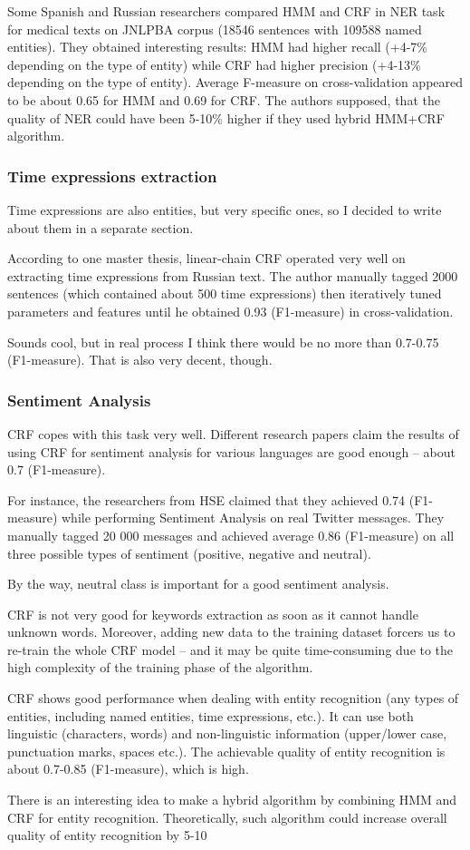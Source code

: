 Some Spanish and Russian researchers compared HMM and CRF in NER task for medical texts on JNLPBA corpus (18546 sentences with 109588 named entities). They obtained interesting results: HMM had higher recall (+4-7\% depending on the type of entity) while CRF had higher precision (+4-13\% depending on the type of entity). Average F-measure on cross-validation appeared to be about 0.65 for HMM and 0.69 for CRF. The authors supposed, that the quality of NER could have been 5-10\% higher if they used hybrid HMM+CRF algorithm.


\subsubsection{Time expressions extraction}

Time expressions are also entities, but very specific ones, so I decided to write about them in a separate section.

According to one master thesis, linear-chain CRF operated very well on extracting time expressions from Russian text. The author manually tagged 2000 sentences (which contained about 500 time expressions) then iteratively tuned parameters and features until he obtained 0.93 (F1-measure) in cross-validation.

Sounds cool, but in real process I think there would be no more than 0.7-0.75 (F1-measure). That is also very decent, though.

\subsubsection{Sentiment Analysis}

CRF copes with this task very well. Different research papers claim the results of using CRF for sentiment analysis for various languages are good enough – about 0.7 (F1-measure).

For instance, the researchers from HSE claimed that they achieved 0.74 (F1-measure) while performing Sentiment Analysis on real Twitter messages. They manually tagged 20 000 messages and achieved average 0.86 (F1-measure) on all three possible types of sentiment (positive, negative and neutral).

By the way, neutral class is important for a good sentiment analysis.


CRF is not very good for keywords extraction as soon as it cannot handle unknown words. Moreover, adding new data to the training dataset forcers us to re-train the whole CRF model – and it may be quite time-consuming due to the high complexity of the training phase of the algorithm.

CRF shows good performance when dealing with entity recognition (any types of entities, including named entities, time expressions, etc.). It can use both linguistic (characters, words) and non-linguistic information (upper/lower case, punctuation marks, spaces etc.). The achievable quality of entity recognition is about 0.7-0.85 (F1-measure), which is high.

There is an interesting idea to make a hybrid algorithm by combining HMM and CRF for entity recognition. Theoretically, such algorithm could increase overall quality of entity recognition by 5-10%